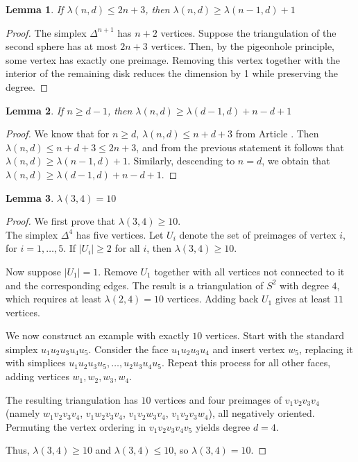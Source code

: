 \documentclass[a4paper,12pt]{article}
\newtheorem{lemma}{Lemma}
\begin{document}
\begin{lemma}
\label{lem:2}
If $\lambda(n, d)\leq 2n+3$, then  $\lambda(n, d)\geq \lambda(n-1,d)+1$
\end{lemma}
\begin{proof}
The simplex $\Delta^{n+1}$ has $n+2$ vertices. Suppose the triangulation of the second sphere has at most $2n+3$ vertices. Then, by the pigeonhole principle, some vertex has exactly one preimage. 
Removing this vertex together with the interior of the remaining disk reduces the dimension by 1 while preserving the degree.
\end{proof}
\medskip
\begin{lemma}
\label{lem:3}
If $n\geq d-1$, then $\lambda(n,d)\geq \lambda(d-1, d)+n-d+1$
\end{lemma}
\begin{proof}
We know that for $n\geq d$, $\lambda(n,d)\leq n+d+3$ from Article \cite{Basak}. Then $\lambda(n,d)\leq n+d+3 \leq 2n+3$, and from the previous statement it follows that $\lambda(n,d)\geq \lambda(n-1,d)+1$. Similarly, descending to $n=d$, we obtain that $\lambda(n,d)\geq \lambda(d-1,d)+n-d+1$. 
\end{proof}
\medskip
\begin{lemma}
\label{lem:4}
$\lambda(3,4)=10$
\end{lemma}
\begin{proof}
We first prove that $\lambda(3,4) \geq 10$.\\
The simplex $\Delta^4$ has five vertices. Let $U_i$ denote the set of preimages of vertex $i$, for $i=1,\dots,5$. If $|U_i| \geq 2$ for all $i$, then $\lambda(3,4) \geq 10$.

Now suppose $|U_1| = 1$. Remove $U_1$ together with all vertices not connected to it and the corresponding edges. The result is a triangulation of $S^2$ with degree $4$, which requires at least $\lambda(2,4) = 10$ vertices. Adding back $U_1$ gives at least $11$ vertices.

We now construct an example with exactly $10$ vertices. Start with the standard simplex $u_1 u_2 u_3 u_4 u_5$. Consider the face $u_1 u_2 u_3 u_4$ and insert vertex $w_5$, replacing it with simplices $u_1 u_2 u_3 u_5, \dots, u_2 u_3 u_4 u_5$. Repeat this process for all other faces, adding vertices $w_1, w_2, w_3, w_4$.

The resulting triangulation has $10$ vertices and four preimages of $v_1 v_2 v_3 v_4$ (namely $w_1 v_2 v_3 v_4$, $v_1 w_2 v_3 v_4$, $v_1 v_2 w_3 v_4$, $v_1 v_2 v_3 w_4$), all negatively oriented. Permuting the vertex ordering in $v_1 v_2 v_3 v_4 v_5$ yields degree $d=4$.

Thus, $\lambda(3,4) \geq 10$ and $\lambda(3,4) \leq 10$, so $\lambda(3,4) = 10$.
\end{proof}
\end{document}
